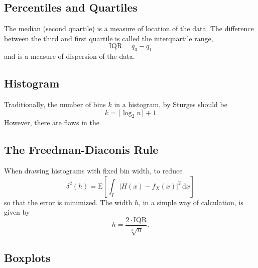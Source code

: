 \documentclass[11pt,a4paper]{article}
\newcommand{\dd}{\mathrm{d}}
\newcommand{\dx}{\dd x}
\begin{document}
\subsection{Percentiles and Quartiles}
The median (second quartile) is a measure of location of the data.
The difference between the third and first quartile is called the
interquartile range,
$$\mathrm{IQR} = q_3 - q_1$$
and is a measure of dispersion of the data.

\subsection{Histogram}
Traditionally, the number of bins $k$ in a histogram, by Sturges should be
\[k=\lceil \log_2n\rceil + 1 \]
However, there are flaws in the

\subsection{The Freedman-Diaconis Rule}
When drawing histograms with fixed bin width, to reduce
\[\delta ^ 2 (h)=\mathrm{E}\left[\int_I \left\lvert H(x)-f_X(x)\right\rvert^2\,\dx \right] \]
so that the error is minimized.
The width $h$, in a simple way of calculation, is given by
\[h=\frac{2\cdot\mathrm{IQR}}{\sqrt[3]{n}}.\]

\subsection{Boxplots}
\end{document}
